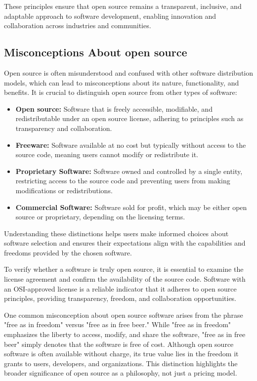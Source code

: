 These principles ensure that open source remains a transparent, inclusive, and adaptable approach to software development, enabling innovation and collaboration across industries and communities.

\cite{Open_Source_Initiative_OS_definition}

\subsection{Misconceptions About open source}

Open source is often misunderstood and confused with other software distribution models, which can lead to misconceptions about its nature, functionality, and benefits. 
It is crucial to distinguish open source from other types of software:

\begin{itemize}
    \item \textbf{Open source:} Software that is freely accessible, modifiable, and redistributable under an open source license, adhering to principles such as transparency and collaboration.
    \item \textbf{Freeware:} Software available at no cost but typically without access to the source code, meaning users cannot modify or redistribute it.
    \item \textbf{Proprietary Software:} Software owned and controlled by a single entity, restricting access to the source code and preventing users from making modifications or redistributions.
    \item \textbf{Commercial Software:} Software sold for profit, which may be either open source or proprietary, depending on the licensing terms.
\end{itemize}

Understanding these distinctions helps users make informed choices about software selection and ensures their expectations align with the capabilities and freedoms provided by the chosen software.

To verify whether a software is truly open source, it is essential to examine the license agreement and confirm the availability of the source code. 
Software with an OSI-approved license is a reliable indicator that it adheres to open source principles, providing transparency, freedom, and collaboration opportunities.

One common misconception about open source software arises from the phrase "free as in freedom" versus "free as in free beer." While "free as in freedom" emphasizes the liberty to access, modify, and share the software, "free as in free beer" simply denotes that the software is free of cost. 
Although open source software is often available without charge, its true value lies in the freedom it grants to users, developers, and organizations. 
This distinction highlights the broader significance of open source as a philosophy, not just a pricing model.

